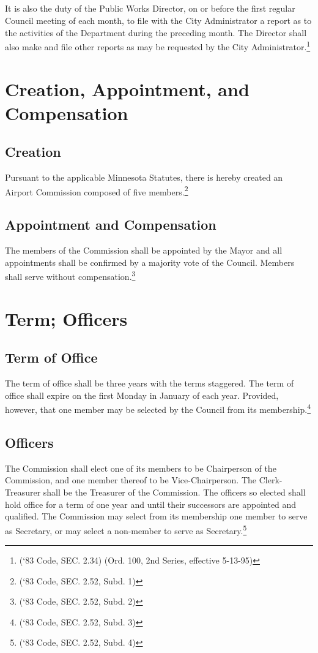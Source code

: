 \subsection{}
It is also the duty of the Public Works Director, on or before the first regular Council meeting of each month, to file with the City Administrator a report as to the activities of the Department during the preceding month.  The Director shall also make and file other reports as may be requested by the City Administrator.\footnote{(‘83 Code, SEC. 2.34)  (Ord. 100, 2nd Series, effective 5-13-95)}\\

\setcounter{section}{99}
\section{Creation, Appointment, and Compensation}
\subsection{Creation}
Pursuant to the applicable Minnesota Statutes, there is hereby created an Airport Commission composed of five members.\footnote{(‘83 Code, SEC. 2.52, Subd. 1)}
\subsection{Appointment and Compensation}
The members of the Commission shall be appointed by the Mayor and all appointments shall be confirmed by a majority vote of the Council.  Members shall serve without compensation.\footnote{(‘83 Code, SEC. 2.52, Subd. 2)}

\section{Term; Officers}
\subsection{Term of Office}
The term of office shall be three years with the terms staggered.  The term of office shall expire on the first Monday in January of each year.  Provided, however, that one member may be selected by the Council from its membership.\footnote{(‘83 Code, SEC. 2.52, Subd. 3)}
\subsection{Officers}
The Commission shall elect one of its members to be Chairperson of the Commission, and one member thereof to be Vice-Chairperson.  The Clerk-Treasurer shall be the Treasurer of the Commission.  The officers so elected shall hold office for a term of one year and until their successors are appointed and qualified.  The Commission may select from its membership one member to serve as Secretary, or may select a non-member to serve as Secretary.\footnote{(‘83 Code, SEC. 2.52, Subd. 4)}

